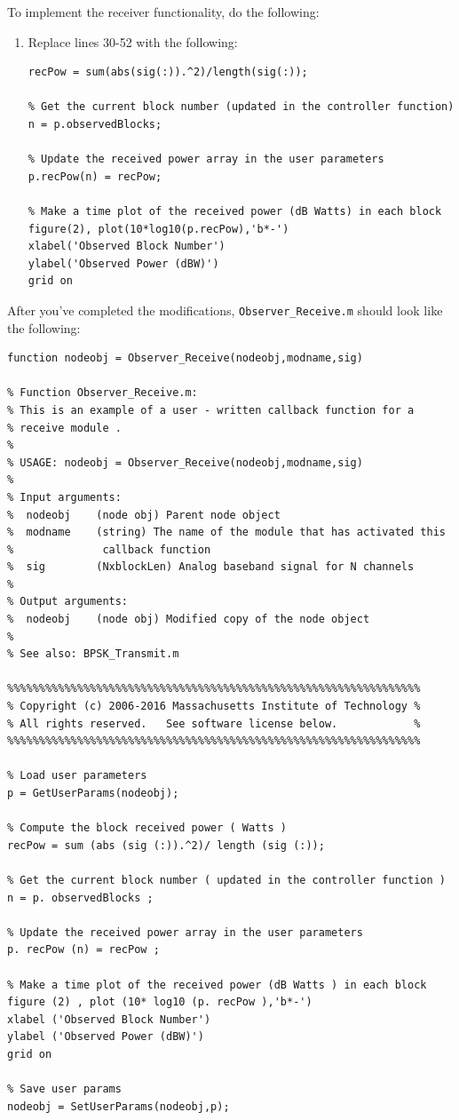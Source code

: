 To implement the receiver functionality, do the following:
\setcounter{enumitemp}{\theenumi}
\begin{enumerate}
\setcounter{enumi}{\theenumitemp}
\item Replace lines 30-52 with the following:
%
\begin{lstlisting}[firstnumber=28]
% Compute the block received power (Watts)
recPow = sum(abs(sig(:)).^2)/length(sig(:));

% Get the current block number (updated in the controller function)
n = p.observedBlocks;

% Update the received power array in the user parameters
p.recPow(n) = recPow;

% Make a time plot of the received power (dB Watts) in each block
figure(2), plot(10*log10(p.recPow),'b*-')
xlabel('Observed Block Number')
ylabel('Observed Power (dBW)')
grid on
\end{lstlisting}
%
\end{enumerate}
After you've completed the modifications, \verb+Observer_Receive.m+ should look like the following:
%
\begin{lstlisting}[firstnumber=1]
function nodeobj = Observer_Receive(nodeobj,modname,sig)

% Function Observer_Receive.m:
% This is an example of a user - written callback function for a
% receive module .
%
% USAGE: nodeobj = Observer_Receive(nodeobj,modname,sig)
%
% Input arguments:
%  nodeobj    (node obj) Parent node object
%  modname    (string) The name of the module that has activated this
%              callback function
%  sig        (NxblockLen) Analog baseband signal for N channels
%
% Output arguments:
%  nodeobj    (node obj) Modified copy of the node object
%
% See also: BPSK_Transmit.m

%%%%%%%%%%%%%%%%%%%%%%%%%%%%%%%%%%%%%%%%%%%%%%%%%%%%%%%%%%%%%%%%%
% Copyright (c) 2006-2016 Massachusetts Institute of Technology %
% All rights reserved.   See software license below.            %
%%%%%%%%%%%%%%%%%%%%%%%%%%%%%%%%%%%%%%%%%%%%%%%%%%%%%%%%%%%%%%%%%

% Load user parameters
p = GetUserParams(nodeobj);

% Compute the block received power ( Watts )
recPow = sum (abs (sig (:)).^2)/ length (sig (:));

% Get the current block number ( updated in the controller function )
n = p. observedBlocks ;

% Update the received power array in the user parameters
p. recPow (n) = recPow ;

% Make a time plot of the received power (dB Watts ) in each block
figure (2) , plot (10* log10 (p. recPow ),'b*-')
xlabel ('Observed Block Number')
ylabel ('Observed Power (dBW)')
grid on

% Save user params
nodeobj = SetUserParams(nodeobj,p);
\end{lstlisting}
%

